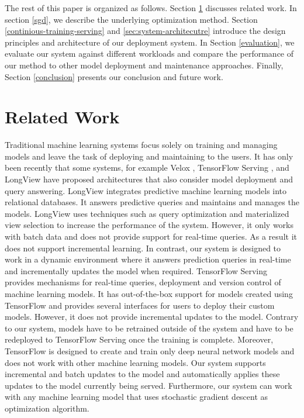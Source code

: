 \documentclass{vldb}
\begin{document}
The rest of this paper is organized as follows. 
Section \ref {related-work} discusses related work.
In section \ref{sgd}, we describe the underlying optimization method.
Section \ref{continious-training-serving} and \ref{sec:system-architecutre} introduce the design principles and architecture of our deployment system.
In Section \ref{evaluation}, we evaluate our system against different workloads and compare the performance of our method to other model deployment and maintenance approaches. 
Finally, Section \ref{conclusion} presents our conclusion and future work.

\section{Related Work} \label{related-work}
Traditional machine learning systems focus solely on training and managing models and leave the task of deploying and maintaining to the users. 
It has only been recently that some systems, for example Velox \cite{crankshaw2014missing}, TensorFlow Serving \cite{abadi2016tensorflow}, and LongView \cite{akdere2011case} have proposed architectures that also consider model deployment and query answering.
LongView integrates predictive machine learning models into relational databases. 
It answers predictive queries and maintains and manages the models.
LongView uses techniques such as query optimization and materialized view selection to increase the performance of the system.
However, it only works with batch data and does not provide support for real-time queries. 
As a result it does not support incremental learning.
In contrast, our system is designed to work in a dynamic environment where it answers prediction queries in real-time and incrementally updates the model when required.
TensorFlow Serving provides mechanisms for real-time queries, deployment and version control of machine learning models.
It has out-of-the-box support for models created using TensorFlow and provides several interfaces for users to deploy their custom models.
However, it does not provide incremental updates to the model.
Contrary to our system, models have to be retrained outside of the system and have to be redeployed to TensorFlow Serving once the training is complete.
Moreover, TensorFlow is designed to create and train only deep neural network models and does not work with other machine learning models.
Our system supports incremental and batch updates to the model and automatically applies these updates to the model currently being served.
Furthermore, our system can work with any machine learning model that uses stochastic gradient descent as optimization algorithm.
\end{document}
